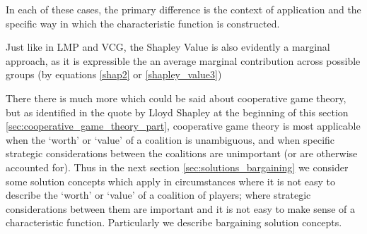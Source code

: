 In each of these cases, the primary difference is the context of application and the specific way in which the characteristic function is constructed.


Just like in LMP and VCG, the Shapley Value is also evidently a marginal approach, as it is expressible the an average marginal contribution across possible groups (by equations \ref{shap2} or \ref{shapley_value3})


There there is much more which could be said about cooperative game theory, but as identified in the quote by Lloyd Shapley at the beginning of this section \ref{sec:cooperative_game_theory_part}, cooperative game theory is most applicable when the `worth' or `value' of a coalition is unambiguous, and when specific strategic considerations between the coalitions are unimportant (or are otherwise accounted for).
Thus in the next section \ref{sec:solutions_bargaining} we consider some solution concepts which apply in circumstances where it is not easy to describe the `worth' or `value' of a coalition of players; where strategic considerations between them are important and it is not easy to make sense of a characteristic function.
Particularly we describe bargaining solution concepts.


